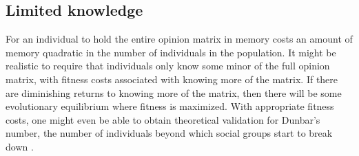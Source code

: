 \documentclass{amsart}
\begin{document}
\subsection{Limited knowledge}

For an individual to hold the entire opinion matrix in memory costs an
amount of memory quadratic in the number of individuals in the
population. It might be realistic to require that individuals only
know some minor of the full opinion matrix, with fitness costs
associated with knowing more of the matrix. If there are diminishing
returns to knowing more of the matrix, then there will be some
evolutionary equilibrium where fitness is maximized. With appropriate
fitness costs, one might even be able to obtain theoretical validation
for Dunbar's number, the number of individuals beyond which social
groups start to break down \cite{dunbar_neocortex_1995}.

 
\end{document}
